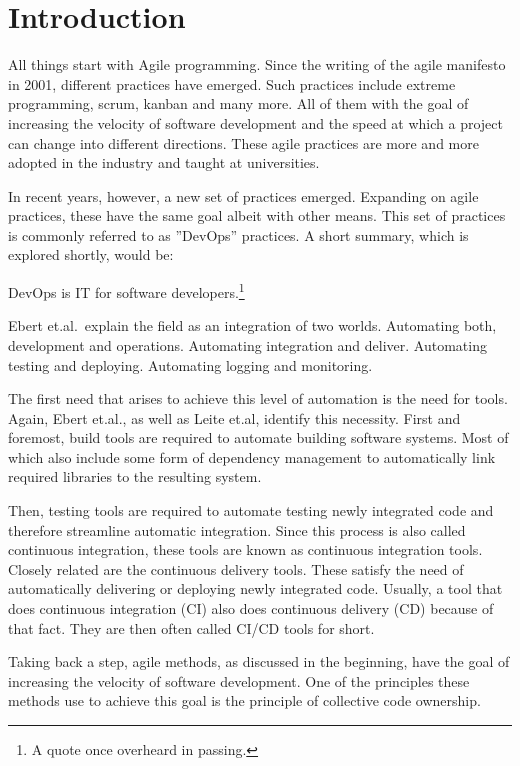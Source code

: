 \chapter{Introduction}
\label{ch:introduction}

All things start with Agile programming.
Since the writing of the agile manifesto\cite{AgileManifesto} in 2001, different practices have emerged.
Such practices include extreme programming, scrum, kanban and many more\cite{ADecadeOfAgileMethodologies}.
All of them with the goal of increasing the velocity of software development and the speed at which a project can change into different directions.
These agile practices are more and more adopted in the industry\cite{BecomingAgileTogether} and taught at universities\cite{StudienhandbuchProjectManagement}.

In recent years, however, a new set of practices emerged.
Expanding on agile practices, these have the same goal albeit with other means.
This set of practices is commonly referred to as ''DevOps'' practices.
A short summary, which is explored shortly, would be:

DevOps is IT for software developers.\footnote{A quote once overheard in passing.}

Ebert et.al.\ explain the field as an integration of two worlds\cite{DevOps}.
Automating both, development and operations.
Automating integration and deliver.
Automating testing and deploying.
Automating logging and monitoring.

The first need that arises to achieve this level of automation is the need for tools.
Again, Ebert et.al., as well as Leite et.al, identify this necessity\cite{DevOps, ASurveyofDevOpsConceptsandChallenges}.
First and foremost, build tools are required to automate building software systems.
Most of which also include some form of dependency management to automatically link required libraries to the resulting system.

Then, testing tools are required to automate testing newly integrated code and therefore streamline automatic integration.
Since this process is also called continuous integration, these tools are known as continuous integration tools\cite{DevOps}.
Closely related are the continuous delivery tools.
These satisfy the need of automatically delivering or deploying newly integrated code.
Usually, a tool that does continuous integration (CI) also does continuous delivery (CD) because of that fact.
They are then often called CI/CD tools for short.

Taking back a step, agile methods, as discussed in the beginning, have the goal of increasing the velocity of software development\cite{ADecadeOfAgileMethodologies}.
One of the principles these methods use to achieve this goal is the principle of collective code ownership\cite{CommonAgilePracticesInSoftwareProcesses, ManagingCodeOwnership}.


